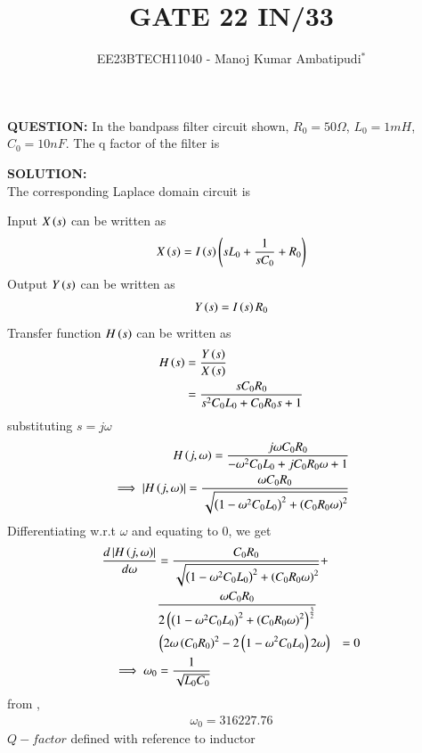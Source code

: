 \documentclass[journal,12pt,twocolumn]{IEEEtran}
\theoremstyle{remark}
\begin{document}

\vspace{3cm}
\title{GATE 22 IN/33}
\author{EE23BTECH11040 - Manoj Kumar Ambatipudi$^{*}$%
}
\maketitle
\newpage
\bigskip
\renewcommand{\thefigure}{\theenumi}
\renewcommand{\thetable}{\theenumi}
\textbf{QUESTION:}
In the bandpass filter circuit shown, $R_0 = 50\Omega$, $L_0 = 1 mH$, $C_0 = 10nF$. The q factor of the filter is 

\textbf{SOLUTION:}
\\
The corresponding Laplace domain circuit is 

Input $X\left(s\right)$ can be written as
\begin{align}
    X\left(s\right) = I\left(s\right)\left(sL_0 + \frac{1}{sC_0} + R_0\right) 
\end{align}
Output $Y\left(s\right)$ can be written as 
\begin{align}
    Y\left(s\right) = I\left(s\right)R_0
\end{align}
Transfer function $H\left(s\right)$ can be written as 
\begin{align}
    H\left(s\right) &= \frac{Y\left(s\right)}{X\left(s\right)}\\ &= \frac{sC_0R_0}{s^2C_0L_0 + C_0R_0s + 1}
\end{align}
substituting $s = j\omega$
\begin{align}
    H\left(j,\omega\right) = \frac{j\omega C_0R_0}{-\omega^2C_0L_0 + jC_0R_0\omega + 1}\\
\implies \left\vert H\left(j,\omega\right)\right\vert = \frac{\omega C_0R_0}{\sqrt{\left(1-\omega^2C_0L_0\right)^2 + \left(C_0R_0\omega\right)^{2}}}
\end{align}
Differentiating w.r.t $\omega$ and equating to 0, we get 
\begin{align}
    \frac{d\left\vert H\left(j,\omega\right)\right\vert}{d\omega} &= \frac{C_0R_0}{\sqrt{\left(1-\omega^2C_0L_0\right)^2 + \left(C_0R_0\omega\right)^{2}}} +\notag\\& \frac{\omega C_0R_0}{2\left(\left(1-\omega^2C_0L_0\right)^2 + \left(C_0R_0\omega\right)^{2}\right)^{\frac{3}{2}}}\notag\\&\left(2\omega\left(C_0R_0\right)^2-2\left(1-\omega^2C_0L_0\right)2\omega\right) &= 0\\
    \implies \omega_0 &= \frac{1}{\sqrt{L_0C_0}}\label{eq_22_33_1}
\end{align}
from , 
\begin{align}
    \omega_0 = 316227.76
\end{align}
$Q-factor$ defined with reference to inductor
\end{document}
